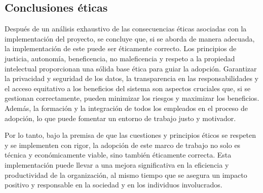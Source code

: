 \subsection{Conclusiones éticas}
Después de un análisis exhaustivo de las consecuencias éticas asociadas con la 
implementación del proyecto, se concluye que, si se aborda de manera adecuada, la 
implementación de este puede ser éticamente correcto. Los principios de 
justicia, autonomía, beneficencia, no maleficencia y respeto a la propiedad 
intelectual proporcionan una sólida base ética para guiar la adopción.
Garantizar la privacidad y seguridad de los datos, la transparencia en las 
responsabilidades y el acceso equitativo a los beneficios del sistema son aspectos 
cruciales que, si se gestionan correctamente, pueden minimizar los riesgos y 
maximizar los beneficios. Además, la formación y la integración de todos los 
empleados en el proceso de adopción, lo que puede fomentar un entorno de trabajo 
justo y motivador.\medskip

Por lo tanto, bajo la premisa de que las cuestiones y principios éticos 
se respeten y se implementen con rigor, la adopción de este marco de trabajo no solo es 
técnica y económicamente viable, sino también éticamente correcta. Esta implementación puede 
llevar a una mejora significativa en la eficiencia y productividad de la organización, 
al mismo tiempo que se asegura un impacto positivo y responsable en la sociedad y en 
los individuos involucrados.

\pagebreak